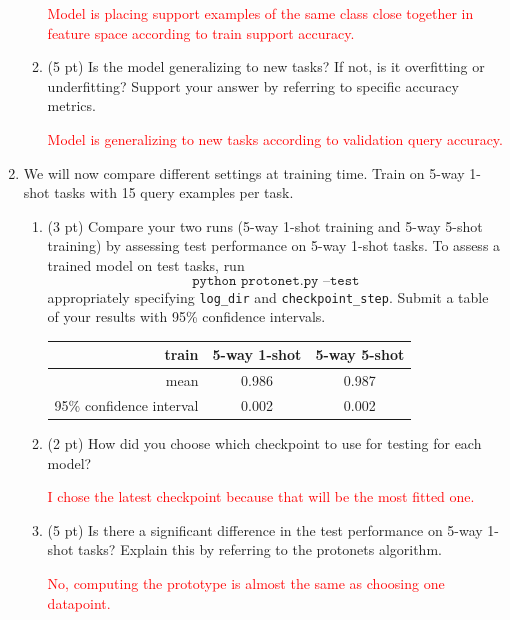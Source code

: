 \documentclass[12pt]{article}
\begin{document}
\begin{enumerate}
\begin{enumerate}[label=(\alph*)]
        \textcolor{red}{Model is placing support examples of the same class close together in feature space according to train support accuracy.}

        
        \item (5 pt) Is the model generalizing to new tasks? If not, is it overfitting or underfitting? Support your answer by referring to specific accuracy metrics.
        
        \textcolor{red}{Model is generalizing to new tasks according to validation query accuracy.}

    \end{enumerate}
    
    \newpage
    \item We will now compare different settings at training time. Train on 5-way 1-shot tasks with 15 query examples per task. 
    \begin{enumerate}
        \item (3 pt) Compare your two runs (5-way 1-shot training and 5-way 5-shot training) by assessing test performance on 5-way 1-shot tasks. To assess a trained model on test tasks, run
        \begin{equation*}
            \texttt{python protonet.py --test}
        \end{equation*}
    appropriately specifying \texttt{log\_dir} and \texttt{checkpoint\_step}. Submit a table of your results with 95\% confidence intervals.
        
\begin{tabular}{r|cc}
train                              &5-way 1-shot&5-way 5-shot\\\hline
mean                            &0.986            &0.987            \\ 
95\% confidence interval&0.002            &0.002            \\
\end{tabular}
        
        \item (2 pt) How did you choose which checkpoint to use for testing for each model? 
        
        \textcolor{red}{I chose the latest checkpoint because that will be the most fitted one.}
        
        \item (5 pt) Is there a significant difference in the test performance on 5-way 1-shot tasks? Explain this by referring to the protonets algorithm.
        
        \textcolor{red}{No, computing the prototype is almost the same as choosing one datapoint.}

    \end{enumerate}
    
    

\end{enumerate}
\end{document}
